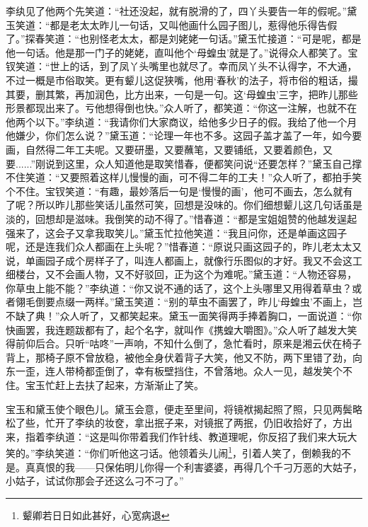 \documentclass[12pt,oneside]{book}
\begin{document}
李纨见了他两个先笑道：“社还没起，就有脱滑的了，四丫头要告一年的假呢。”黛玉笑道：“都是老太太昨儿一句话，又叫他画什么园子图儿，惹得他乐得告假了。”探春笑道：“也别怪老太太，都是刘姥姥一句话。”黛玉忙接道：“可是呢，都是他一句话。他是那一门子的姥姥，直叫他个‘母蝗虫’就是了。”说得众人都笑了。宝钗笑道：“世上的话，到了凤丫头嘴里也就尽了。幸而凤丫头不认得字，不大通，不过一概是市俗取笑。更有颦儿这促狭嘴，他用‘春秋’的法子，将市俗的粗话，撮其要，删其繁，再加润色，比方出来，一句是一句。这‘母蝗虫’三字，把昨儿那些形景都现出来了。亏他想得倒也快。”众人听了，都笑道：“你这一注解，也就不在他两个以下。”李纨道：“我请你们大家商议，给他多少日子的假。我给了他一个月他嫌少，你们怎么说？”黛玉道：“论理一年也不多。这园子盖才盖了一年，如今要画，自然得二年工夫呢。又要研墨，又要蘸笔，又要铺纸，又要着颜色，又要......”刚说到这里，众人知道他是取笑惜春，便都笑问说“还要怎样？”黛玉自己撑不住笑道：“又要照着这样儿慢慢的画，可不得二年的工夫！”众人听了，都拍手笑个不住。宝钗笑道：“有趣，最妙落后一句是‘慢慢的画’，他可不画去，怎么就有了呢？所以昨儿那些笑话儿虽然可笑，回想是没味的。你们细想颦儿这几句话虽是淡的，回想却是滋味。我倒笑的动不得了。”惜春道：“都是宝姐姐赞的他越发逞起强来了，这会子又拿我取笑儿。”黛玉忙拉他笑道：“我且问你，还是单画这园子呢，还是连我们众人都画在上头呢？”惜春道：“原说只画这园子的，昨儿老太太又说，单画园子成个房样子了，叫连人都画上，就像行乐图似的才好。我又不会这工细楼台，又不会画人物，又不好驳回，正为这个为难呢。”黛玉道：“人物还容易，你草虫上能不能？”李纨道：“你又说不通的话了，这个上头哪里又用得着草虫？或者翎毛倒要点缀一两样。”黛玉笑道：“别的草虫不画罢了，昨儿‘母蝗虫’不画上，岂不缺了典！”众人听了，又都笑起来。黛玉一面笑得两手捧着胸口，一面说道：“你快画罢，我连题跋都有了，起个名字，就叫作《携蝗大嚼图》。”众人听了越发大笑得前仰后合。只听“咕咚”一声响，不知什么倒了，急忙看时，原来是湘云伏在椅子背上，那椅子原不曾放稳，被他全身伏着背子大笑，他又不防，两下里错了劲，向东一歪，连人带椅都歪倒了，幸有板壁挡住，不曾落地。众人一见，越发笑个不住。宝玉忙赶上去扶了起来，方渐渐止了笑。

宝玉和黛玉使个眼色儿。黛玉会意，便走至里间，将镜袱揭起照了照，只见两鬓略松了些，忙开了李纨的妆奁，拿出抿子来，对镜抿了两抿，仍旧收拾好了，方出来，指着李纨道：“这是叫你带着我们作针线、教道理呢，你反招了我们来大玩大笑的。”李纨笑道：“你们听他这刁话。他领着头儿闹\footnote{颦卿若日日如此甚好，心宽病退}，引着人笑了，倒赖我的不是。真真恨的我——只保佑明儿你得一个利害婆婆，再得几个千刁万恶的大姑子，小姑子，试试你那会子还这么刁不刁了。”
\end{document}
